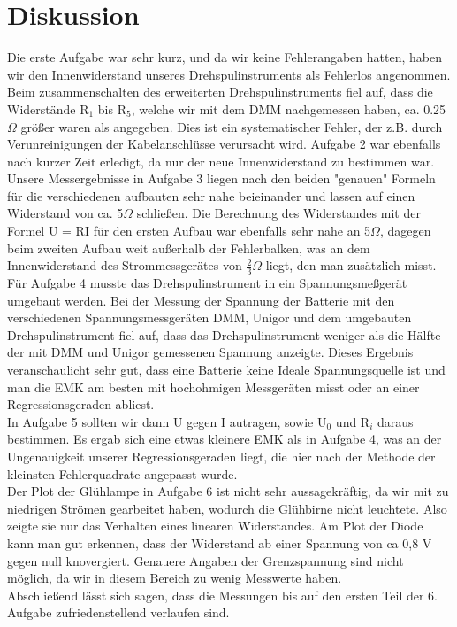 \documentclass[12pt]{scrartcl}
\begin{document}
\newpage

\section{Diskussion}

Die erste Aufgabe war sehr kurz, und da wir keine Fehlerangaben hatten, haben wir den Innenwiderstand unseres Drehspulinstruments als Fehlerlos angenommen.\\
Beim zusammenschalten des erweiterten Drehspulinstruments fiel auf, dass die Widerstände R$_1$ bis R$_5$, welche wir mit dem DMM nachgemessen haben, ca. 0.25$\Omega$ größer waren als angegeben. Dies ist ein systematischer Fehler, der z.B. durch Verunreinigungen der Kabelanschlüsse verursacht wird. Aufgabe 2 war ebenfalls nach kurzer Zeit erledigt, da nur der neue Innenwiderstand zu bestimmen war.\\
Unsere Messergebnisse in Aufgabe 3 liegen nach den beiden "genauen" Formeln für die verschiedenen aufbauten sehr nahe beieinander und lassen auf einen Widerstand von ca. 5$\Omega$ schließen. Die Berechnung des Widerstandes mit der Formel U = RI für den ersten Aufbau war ebenfalls sehr nahe an 5$\Omega$, dagegen beim zweiten Aufbau weit außerhalb der Fehlerbalken, was an dem Innenwiderstand des Strommessgerätes von $\frac{2}{3}\Omega$ liegt, den man zusätzlich misst.\\
Für Aufgabe 4 musste das Drehspulinstrument in ein Spannungsmeßgerät umgebaut werden. Bei der Messung der Spannung der Batterie mit den verschiedenen Spannungsmessgeräten DMM, Unigor und dem umgebauten Drehspulinstrument fiel auf, dass das Drehspulinstrument weniger als die Hälfte der mit DMM und Unigor gemessenen Spannung anzeigte. Dieses Ergebnis veranschaulicht sehr gut, dass eine Batterie keine Ideale Spannungsquelle ist und man die EMK am besten mit hochohmigen Messgeräten misst oder an einer Regressionsgeraden abliest.\\
In Aufgabe 5 sollten wir dann U gegen I autragen, sowie U$_0$ und R$_i$ daraus bestimmen. Es ergab sich eine etwas kleinere EMK als in Aufgabe 4, was an der Ungenauigkeit unserer Regressionsgeraden liegt, die hier nach der Methode der kleinsten Fehlerquadrate angepasst wurde.\\
Der Plot der Glühlampe in Aufgabe 6 ist nicht sehr aussagekräftig, da wir mit zu niedrigen Strömen gearbeitet haben, wodurch die Glühbirne nicht leuchtete. Also zeigte sie nur das Verhalten eines linearen Widerstandes.
Am Plot der Diode kann man gut erkennen, dass der Widerstand ab einer Spannung von ca 0,8 V gegen null knovergiert. Genauere Angaben der Grenzspannung sind nicht möglich, da wir in diesem Bereich zu wenig Messwerte haben.\\
Abschließend lässt sich sagen, dass die Messungen bis auf den ersten Teil der 6. Aufgabe zufriedenstellend verlaufen sind.

\end{document}
